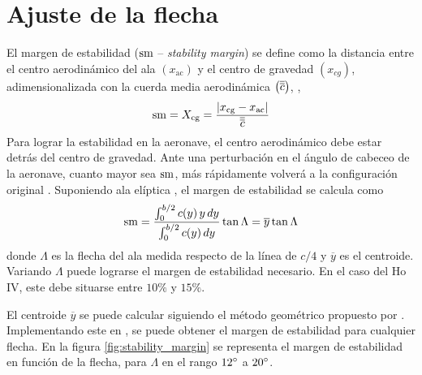 
\section{Ajuste de la flecha} \label{sec:ajuste_flecha}

El margen de estabilidad ($\mathrm{sm}$ -- \emph{stability margin}) se define como la distancia entre el centro aerodinámico del ala $\left( x_\text{ac} \right)$ y el centro de gravedad $\left( x_{cg} \right)$, adimensionalizada con la cuerda media aerodinámica $\left( \overline{\overline{c}} \right)$, \ie,
\begin{equation} \label{eq:calculo_sm_1}
    \sm = X_\text{cg} = \frac{\left\lvert x_\text{cg} - x_\text{ac} \right\rvert}{\mac} 
\end{equation}
Para lograr la estabilidad en la aeronave, el centro aerodinámico debe estar detrás del centro de gravedad. Ante una perturbación en el ángulo de cabeceo de la aeronave, cuanto mayor sea $\mathrm{sm}$, más rápidamente volverá a la configuración original \cite{aerotools_2}. Suponiendo ala elíptica \cite{hoerner_1}, el margen de estabilidad se calcula como 
\begin{equation} \label{eq:calculo_sm_2}
    \sm = \frac{\int_0^{b/2} c(y) \, y \, dy}{\int_0^{b/2} c(y) \, d y} \tan{\Lambda} = 
    \overline{y} \tan{\Lambda}
\end{equation}
donde $\Lambda$ es la flecha del ala medida respecto de la línea de $c/4$ y $\overline{y}$ es el centroide. Variando $\Lambda$ puede lograrse el margen de estabilidad necesario. En el caso del Ho IV, este debe situarse entre $10\%$ y $15\%$.

El centroide $\overline{y}$ se puede calcular siguiendo el método geométrico propuesto por \cite{hoerner_1}. Implementando este en \MATLAB, se puede obtener el margen de estabilidad para cualquier flecha. En la figura \ref{fig:stability_margin} se representa el margen de estabilidad en función de la flecha, para $\Lambda$ en el rango $12\mathrm{^{\circ}}$ a $20\mathrm{^{\circ}}$.

